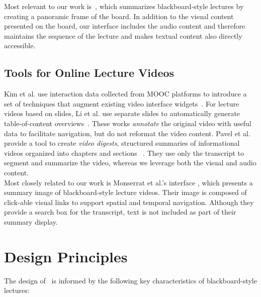 Most relevant to our work is~\cite{choudary2007summarization}, which summarizes blackboard-style lectures by creating a panoramic frame of the board. In addition to the visual content presented on the board, our interface includes the audio content and therefore maintains the sequence of the lecture and makes textual content also directly accessible.\\

\subsection{Tools for Online Lecture Videos}
Kim et al. use interaction data collected from MOOC platforms to introduce a set of techniques that augment existing video interface widgets~\cite{kim2014data}. For lecture videos based on slides, Li et al. use separate slides to automatically generate table-of-content overviews~\cite{kim2014data}. These works \textit{annotate} the original video with useful data to facilitate navigation, but do not reformat the video content. Pavel et al. provide a tool to create \textit{video digests}, structured summaries of informational videos organized into chapters and sections~\cite{pavel2014video} . They use  only the transcript to segment and summarize the video, whereas we leverage both the visual and audio content.\\

Most closely related to our work is Monserrat et al.'s interface \cite{monserrat2013notevideo}, which presents a summary image of blackboard-style lecture videos. Their image is composed of click-able visual links to support spatial and temporal navigation. Although they provide a search box for the transcript, text is not included as part of their summary display.

\section{Design Principles}
\label{sec:principles}
%
The design of \systemname\ is informed by the following key characteristics of blackboard-style lectures:
%
